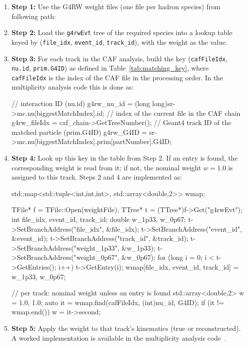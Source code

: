 \documentclass[%
article,
nofootinbib
]{revtex4-2}
\begin{document}
\begin{enumerate}
  \item[] \textbf{Step 1:} Use the G4RW weight files (one file per
    hadron species) from following path:

  \item[] \textbf{Step 2:} Load the \texttt{g4rwEvt} tree of the required
    species into a lookup table keyed by
    (\texttt{file\_idx}, \texttt{event\_id}, \texttt{track\_id}), with the
    weight as the value.

  \item[] \textbf{Step 3:} For each track in the CAF analysis, build the key
    (\texttt{cafFileIdx}, \texttt{nu.id}, \texttt{prim.G4ID}) as defined in
    Table~\ref{tab:matching_key}, where \texttt{cafFileIdx} is the index of
    the CAF file in the processing order. In the multiplicity analysis code
    this is done as:
\begin{cppcode}
// interaction ID (nu.id)
g4rw_nu_id   = (long long)sr->mc.nu[biggestMatchIndex].id;
// index of the current file in the CAF chain
g4rw_fileIdx = caf_chain->GetTreeNumber();
// Geant4 track ID of the matched particle (prim.G4ID)
g4rw_G4ID    = sr->mc.nu[biggestMatchIndex].prim[partNumber].G4ID;
\end{cppcode}

  \item[] \textbf{Step 4:} Look up this key in the table from Step 2. If an
    entry is found, the corresponding weight is read from it; if not, the
    nominal weight $w=1.0$ is assigned to this track. Steps 2 and 4 are
    implemented as:
\begin{cppcode}
std::map<std::tuple<int,int,int>, std::array<double,2>> wmap;

TFile* f = TFile::Open(weightFile);
TTree* t = (TTree*)f->Get("g4rwEvt");
int file_idx, event_id, track_id;
double w_1p33, w_0p67;
t->SetBranchAddress("file_idx",    &file_idx);
t->SetBranchAddress("event_id",    &event_id);
t->SetBranchAddress("track_id",    &track_id);
t->SetBranchAddress("weight_1p33", &w_1p33);
t->SetBranchAddress("weight_0p67", &w_0p67);
for (long i = 0; i < t->GetEntries(); i++) {
    t->GetEntry(i);
    wmap[{file_idx, event_id, track_id}] = {w_1p33, w_0p67};
}

// per track: nominal weight unless an entry is found
std::array<double,2> w = {1.0, 1.0};
auto it = wmap.find({cafFileIdx, (int)nu_id, G4ID});
if (it != wmap.end()) w = it->second;
\end{cppcode}

  \item[] \textbf{Step 5:} Apply the weight to that track's kinematics
    (true or reconstructed). A worked implementation is available in the
    multiplicity analysis code~\cite{proton_plots_repo}.
\end{enumerate}
\end{document}
